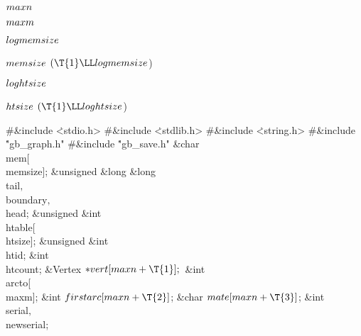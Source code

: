 \Y\B\4\D$\\{maxn}$ \5
\par
\B\4\D$\\{maxm}$ \5
\par
\B\4\D$\\{logmemsize}$ \5
\par
\B\4\D$\\{memsize}$ \5
$(\T{1}\LL\\{logmemsize}{}$)\par
\B\4\D$\\{loghtsize}$ \5
\par
\B\4\D$\\{htsize}$ \5
$(\T{1}\LL\\{loghtsize}{}$)\par
\Y\B\8\#\&{include} \.{<stdio.h>}\6
\8\#\&{include} \.{<stdlib.h>}\6
\8\#\&{include} \.{<string.h>}\6
\8\#\&{include} \.{"gb\_graph.h"}\6
\8\#\&{include} \.{"gb\_save.h"}\6
\&{char} \\{mem}[\\{memsize}];\6
\&{unsigned} \&{long} \&{long} \\{tail}${},{}$ \\{boundary}${},{}$ \\{head};\6
\&{unsigned} \&{int} \\{htable}[\\{htsize}];\6
\&{unsigned} \&{int} \\{htid};\6
\&{int} \\{htcount};\6
\&{Vertex} ${}{*}\\{vert}[\\{maxn}+\T{1}];{}$\6
\&{int} \\{arcto}[\\{maxm}];\6
\&{int} ${}\\{firstarc}[\\{maxn}+\T{2}]{}$;\6
\&{char} ${}\\{mate}[\\{maxn}+\T{3}]{}$;\6
\&{int} \\{serial}${},{}$ \\{newserial};\7
